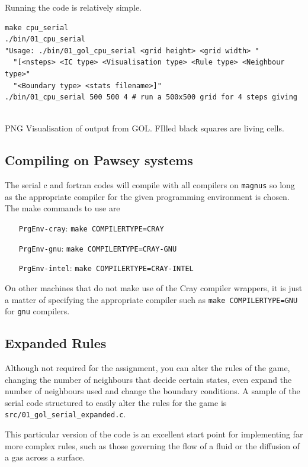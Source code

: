 \par 
Running the code is relatively simple.  
\begin{center}
\begin{minipage}{0.95\textwidth}
\small
\begin{verbatim}
make cpu_serial
./bin/01_cpu_serial 
"Usage: ./bin/01_gol_cpu_serial <grid height> <grid width> "
  "[<nsteps> <IC type> <Visualisation type> <Rule type> <Neighbour type>"
  "<Boundary type> <stats filename>]"
./bin/01_cpu_serial 500 500 4 # run a 500x500 grid for 4 steps giving 
\end{verbatim}
\\	PNG Visualisation of output from GOL. FIlled black squares are living cells.
\end{minipage}
\end{center}

\subsection{Compiling on Pawsey systems}
The serial c and fortran codes will compile with all compilers on \texttt{magnus} so long as the appropriate compiler for the given programming environment is chosen. The make commands to use are 
\begin{itemize}
    \setlength{\itemindent}{70pt}
    \item[\texttt{PrgEnv-cray}:\quad]{\texttt{make COMPILERTYPE=CRAY}}
    \item[\texttt{PrgEnv-gnu}:\quad]{\texttt{make COMPILERTYPE=CRAY-GNU}}
    \item[\texttt{PrgEnv-intel}:\quad]{\texttt{make COMPILERTYPE=CRAY-INTEL}}
\end{itemize}
On other machines that do not make use of the Cray compiler wrappers, it is just a matter of specifying the appropriate compiler such as \texttt{make COMPILERTYPE=GNU} for \texttt{gnu} compilers.

\subsection{Expanded Rules}
Although not required for the assignment, you can alter the rules of the game, changing the number of neighbours that decide certain states, even expand the number of neighbours used and change the boundary conditions. A sample of the serial code structured to easily alter the rules for the game is \texttt{src/01\_gol\_serial\_expanded.c}.

\par 
This particular version of the code is an excellent start point for implementing far more complex rules, such as those governing the flow of a fluid or the diffusion of a gas across a surface.  
